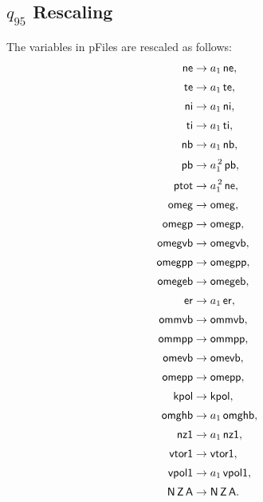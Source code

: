 \documentclass[12pt]{article}
\begin{document}
\subsection{$q_{95}$ Rescaling}
The variables in pFiles are rescaled as follows:
\begin{align}
{\sf ne} &\rightarrow a_1\,{\sf ne},\\[0.5ex]
{\sf te} &\rightarrow a_1\,{\sf te},\\[0.5ex]
{\sf ni}& \rightarrow a_1\,{\sf ni},\\[0.5ex]
{\sf ti}&\rightarrow a_1\,{\sf ti},\\[0.5ex]
{\sf nb} &\rightarrow a_1\, {\sf nb},\\[0.5ex]
{\sf pb} &\rightarrow a_1^{\,2}\,{\sf pb},\\[0.5ex]
{\sf ptot} &\rightarrow a_1^{\,2}\,{\sf ne},\\[0.5ex]
{\sf omeg} &\rightarrow {\sf omeg},\\[0.5ex]
{\sf omegp}& \rightarrow {\sf omegp},\\[0.5ex]
{\sf omegvb}&\rightarrow {\sf omegvb},\\[0.5ex]
{\sf omegpp} &\rightarrow {\sf omegpp},\\[0.5ex]
{\sf omegeb} &\rightarrow {\sf omegeb},\\[0.5ex]
{\sf er} &\rightarrow a_1\,{\sf er},\\[0.5ex]
{\sf ommvb}& \rightarrow{\sf ommvb},\\[0.5ex]
{\sf ommpp}&\rightarrow {\sf ommpp},\\[0.5ex]
{\sf omevb} &\rightarrow  {\sf omevb},\\[0.5ex]
{\sf omepp} &\rightarrow {\sf omepp},\\[0.5ex]
{\sf kpol} &\rightarrow {\sf kpol},\\[0.5ex]
{\sf omghb}& \rightarrow a_1\,{\sf omghb},\\[0.5ex]
{\sf nz1}&\rightarrow a_1\,{\sf nz1},\\[0.5ex]
{\sf vtor1} &\rightarrow {\sf vtor1},\\[0.5ex]
{\sf vpol1} &\rightarrow a_1\,{\sf vpol1},\\[0.5ex]
{\sf N\,Z\,A} &\rightarrow {\sf N\,Z\,A}.
\end{align}
\end{document}
